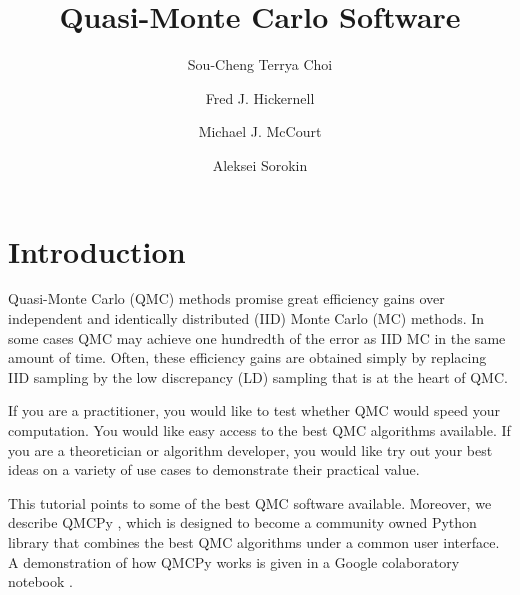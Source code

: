 \documentclass[graybox,footinfo]{svmult}
\begin{document}
\title*{Quasi-Monte Carlo Software}
\author{Sou-Cheng Terrya Choi \and Fred J. Hickernell \and Michael J. McCourt \and Aleksei Sorokin}

\maketitle




\section{Introduction}
Quasi-Monte Carlo (QMC) methods promise great efficiency gains over independent and identically distributed (IID) Monte Carlo (MC) methods.  In some cases QMC may achieve one hundredth of the error as IID MC in the same amount of time. Often, these efficiency gains are obtained simply by  replacing IID sampling by the low discrepancy (LD) sampling that is at the heart of QMC. 

If you are a practitioner, you would like to test whether QMC would speed your computation.  You would like easy access to the best QMC algorithms available.  If you are a theoretician or algorithm developer, you would like try out your best ideas on a variety of use cases to demonstrate their practical value.  

This tutorial points to some of the best QMC software available.  Moreover, we describe QMCPy \cite{QMCPy2020a}, which is designed to become a community owned Python library that combines the best QMC algorithms under a common user interface.  A demonstration of how QMCPy works is given in a Google colaboratory notebook \cite{QMCPyTutColab2020}.
\end{document}
